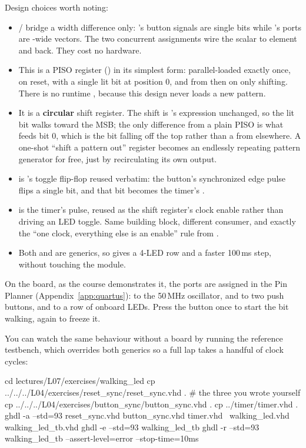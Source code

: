 \noindent Design choices worth noting:
\begin{itemize}
  \item {}/ bridge a width difference only:
    's button signals are single bits while 's ports are
    -wide vectors. The two concurrent assignments wire the scalar to element 
    and back. They cost no hardware.
  \item This is a PISO register () in its simplest form: parallel-loaded exactly
    once, on reset, with a single lit bit at position 0, and from then on only shifting. There is
    no runtime , because this design never loads a new pattern.
  \item It is a \textbf{circular} shift register. The shift is 's expression
    unchanged, so the lit bit walks toward the MSB; the only difference from a plain PISO is what
    feeds bit 0, which is the bit falling off the top rather than a  from
    elsewhere. A one-shot ``shift a pattern out'' register becomes an endlessly repeating pattern
    generator for free, just by recirculating its own output.
  \item {} is 's toggle flip-flop reused verbatim: the button's
    synchronized edge pulse flips a single bit, and that bit becomes the timer's .
  \item {} is the timer's  pulse, reused as the shift register's clock
    enable rather than driving an LED toggle. Same building block, different consumer, and exactly
    the ``one clock, everything else is an enable'' rule from .
  \item Both  and  are generics, so
     gives a 4-LED row and  a
    faster 100\,ms step, without touching the module.
\end{itemize}
On the board, as the course demonstrates it, the ports are assigned in the Pin Planner
(Appendix~\ref{app:quartus}):  to the 50\,MHz oscillator,  and
 to two push buttons, and  to a row of onboard LEDs. Press the button once
to start the bit walking, again to freeze it.

You can watch the same behaviour without a board by running the reference testbench, which
overrides both generics so a full lap takes a handful of clock cycles:

\begin{shell}
cd lectures/L07/exercises/walking_led
cp ../../../L04/exercises/reset_sync/reset_sync.vhd .   # the three you wrote yourself
cp ../../../L04/exercises/button_sync/button_sync.vhd .
cp ../timer/timer.vhd .
ghdl -a --std=93 reset_sync.vhd button_sync.vhd timer.vhd \
                 walking_led.vhd walking_led_tb.vhd
ghdl -e --std=93 walking_led_tb
ghdl -r --std=93 walking_led_tb --assert-level=error --stop-time=10ms
\end{shell}
